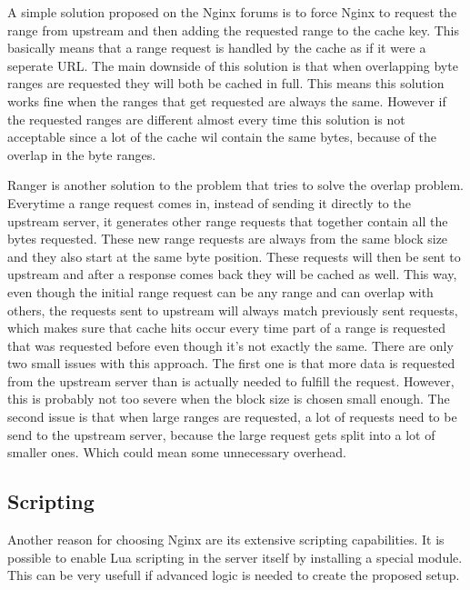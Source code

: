 \documentclass[twoside,openright]{uva-bachelor-thesis}
\begin{document}
A simple solution proposed on the Nginx forums\autocite{nginxcacheforum} is to
force Nginx to request the range from upstream and then adding the requested
range to the cache key. This basically means that a range request is handled by
the cache as if it were a seperate URL. The main downside of this solution is that
when overlapping byte ranges are requested they will both be cached in full.
This means this  solution works fine when the ranges that get requested are
always the same. However if the requested ranges are different almost every
time this solution is not acceptable since a lot of the cache wil contain the
same bytes, because of the overlap in the byte ranges.


Ranger\autocite{ranger} is another solution to the problem that tries to solve
the overlap problem. Everytime a range request comes in, instead of sending it
directly to the upstream server, it generates other range requests that together
contain all the bytes requested. These new range requests are always from the
same block size and they also start at the same byte position. These requests
will then be sent to upstream and after a response comes back they will be
cached as well.  This way, even though the initial range request can be any
range and can overlap with others, the requests sent to upstream will always
match previously sent requests, which makes sure that cache hits occur every
time part of a range is requested that was requested before even though it's not
exactly the same. There are only two small issues with this approach. The first
one is that more data is requested from the upstream server than is actually
needed to fulfill the request. However, this is probably not too severe when the
block size is chosen small enough. The second issue is that when large ranges
are requested, a lot of requests need to be send to the upstream server, because
the large request gets split into a lot of smaller ones. Which could mean some
unnecessary overhead.



\subsection{Scripting}
Another reason for choosing Nginx are its extensive scripting capabilities. It
is possible to enable Lua scripting in the server itself by installing a special
module\autocite{nginxlua}. This can be very usefull if advanced logic is needed
to create the proposed setup.
\end{document}

